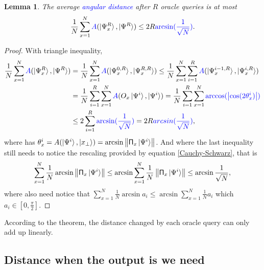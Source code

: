 \documentclass[a4paper,10pt]{book}
\newtheorem{lemma}{Lemma}[section]
\numberwithin{equation}{section}
\begin{document}
\begin{lemma}
    The average \textcolor{blue}{angular distance} after $R$ oracle queries is at most
    \begin{equation}
        \frac{1}{N}\sum_{x=1}^{N}\textcolor{blue}{A}(\ket{\Psi_{x}^{R}},\ket{\Psi^{R}})\leq 2R\textcolor{blue}{\arcsin(\frac{1}{\sqrt{N}})}.
    \end{equation}
\end{lemma}
\begin{proof}
    With triangle inequality,
    \begin{equation*}
        \begin{split}
            \frac{1}{N}\sum_{x=1}^{N}\textcolor{blue}{A}(\ket{\Psi_{x}^{R}},\ket{\Psi^{R}})
             & = \frac{1}{N}\sum_{x=1}^{N}\textcolor{blue}{A}(\ket{\Psi_{x}^{0,R}},\ket{\Psi_{x}^{R,R}})
            \leq \frac{1}{N}\sum_{x=1}^{N}\sum_{i=1}^{R}\textcolor{blue}{A}(\ket{\Psi_{x}^{i-1,R}},\ket{\Psi_{x}^{i,R}})           \\
             & = \frac{1}{N}\sum_{i=1}^{R}\sum_{x=1}^{N}\textcolor{blue}{A}(O_{x}\ket{\Psi^{i}},\ket{\Psi^{i}})
            = \frac{1}{N}\sum_{i=1}^{R}\sum_{x=1}^{N}\textcolor{blue}{\arccos(\left\lvert\cos(2\theta_{x}^{i})\right\rvert)}       \\
             & \leq 2\sum_{i=1}^{R}\textcolor{blue}{\arcsin(\frac{1}{\sqrt{N}})} = 2R\textcolor{blue}{arcsin(\frac{1}{\sqrt{N}})},
        \end{split}
    \end{equation*}
    where has $\theta_{x}^{i}=A(\ket{\Psi^{i}},\ket{x_{\perp}})=\arcsin\left\| \mathsf{\Pi}_{x}\ket{\Psi^{i}}\right\|$. And where the last inequality still needs to notice the rescaling provided by equation \ref{Cauchy-Schwarz}, that is
    \begin{equation*}
        \sum_{x=1}^{N}\frac{1}{N}\arcsin\left\|\mathsf{\Pi}_{x}\ket{\Psi^{i}}\right\|\leq\arcsin\sum_{x=1}^{N}\frac{1}{N}\left\|\mathsf{\Pi}_{x}\ket{\Psi^{i}}\right\|\leq\arcsin\frac{1}{\sqrt{N}},
    \end{equation*}
    where also need notice that $\sum_{x=1}^{N}\frac{1}{N}\arcsin a_{i}\leq\arcsin\sum_{x=1}^{N}\frac{1}{N}a_{i}$ which $a_{i}\in\left[0,\frac{\pi}{2}\right]$.
\end{proof}
According to the theorem, the distance changed by each oracle query can only add up linearly.



\subsection{\label{DistanceWhenWeNeed}Distance when the output is we need}
\end{document}
